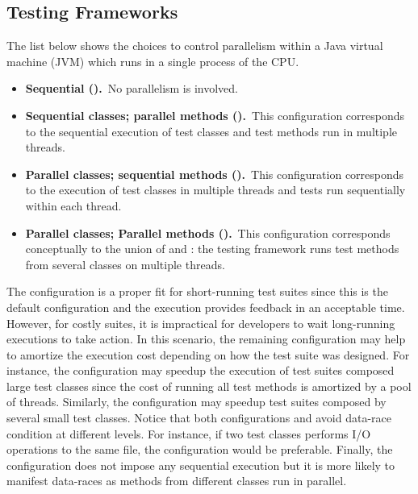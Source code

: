\subsection{Testing Frameworks}
\label{sec:frameworks}

The list below shows the choices to control parallelism within a Java
virtual machine (JVM) which runs in a single process of the CPU.

\begin{itemize}
\item
    \textbf{Sequential (\Seq).}~No parallelism is involved.
\item
    \textbf{Sequential classes; parallel methods
        (\SeqClassParMeth).}~This configuration corresponds to the
        sequential execution of test classes and test methods run in
        multiple threads.
\item
    \textbf{Parallel classes; sequential methods
        (\ParClassSeqMeth{}).}~This configuration corresponds to the
        execution of test classes in multiple threads and tests run
        sequentially within each thread.
\item
    \textbf{Parallel classes; Parallel methods
        (\ParClassParMeth).}~This configuration corresponds
        conceptually to the union of \ParClassSeqMeth{} and
        \SeqClassParMeth{}: the testing framework runs test methods
        from several classes on multiple threads.
\end{itemize}

The configuration \Seq{} is a proper fit for short-running test suites
since this is the default configuration and the execution provides
feedback in an acceptable time. However, for costly suites, it is
impractical for developers to wait long-running executions to take
action.  In this scenario, the remaining configuration may help to
amortize the execution cost depending on how the test suite was
designed. For instance, the configuration \SeqClassParMeth{} may
speedup the execution of test suites composed large test classes since
the cost of running all test methods is amortized by a pool of
threads. Similarly, the configuration \ParClassSeqMeth{} may speedup
test suites composed by several small test classes. Notice that both
configurations \ParClassSeqMeth{} and \SeqClassParMeth{} avoid
data-race condition at different levels.  
For instance, if two test classes performs I/O operations to the same file,
the configuration \SeqClassParMeth{} would be preferable. Finally, 
the configuration \ParClassParMeth{} does not impose any sequential 
execution but it is more likely to manifest data-races as methods 
from different classes run in parallel.

